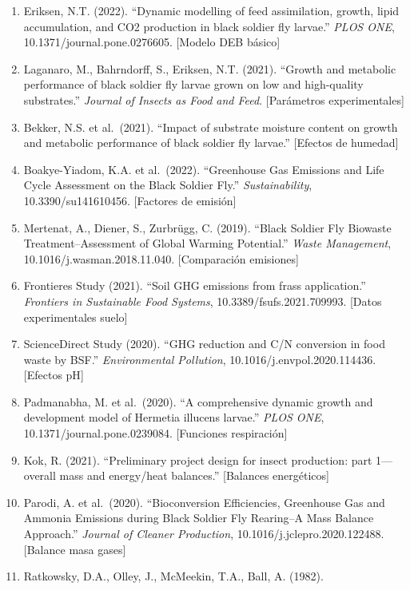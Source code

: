 \documentclass[
]{article}
\begin{document}
\begin{enumerate}
\def\labelenumi{\arabic{enumi}.}
\item
  Eriksen, N.T. (2022). ``Dynamic modelling of feed assimilation,
  growth, lipid accumulation, and CO2 production in black soldier fly
  larvae.'' \emph{PLOS ONE}, 10.1371/journal.pone.0276605. {[}Modelo DEB
  básico{]}
\item
  Laganaro, M., Bahrndorff, S., Eriksen, N.T. (2021). ``Growth and
  metabolic performance of black soldier fly larvae grown on low and
  high-quality substrates.'' \emph{Journal of Insects as Food and Feed}.
  {[}Parámetros experimentales{]}
\item
  Bekker, N.S. et al.~(2021). ``Impact of substrate moisture content on
  growth and metabolic performance of black soldier fly larvae.''
  {[}Efectos de humedad{]}
\item
  Boakye-Yiadom, K.A. et al.~(2022). ``Greenhouse Gas Emissions and Life
  Cycle Assessment on the Black Soldier Fly.'' \emph{Sustainability},
  10.3390/su141610456. {[}Factores de emisión{]}
\item
  Mertenat, A., Diener, S., Zurbrügg, C. (2019). ``Black Soldier Fly
  Biowaste Treatment--Assessment of Global Warming Potential.''
  \emph{Waste Management}, 10.1016/j.wasman.2018.11.040. {[}Comparación
  emisiones{]}
\item
  Frontieres Study (2021). ``Soil GHG emissions from frass
  application.'' \emph{Frontiers in Sustainable Food Systems},
  10.3389/fsufs.2021.709993. {[}Datos experimentales suelo{]}
\item
  ScienceDirect Study (2020). ``GHG reduction and C/N conversion in food
  waste by BSF.'' \emph{Environmental Pollution},
  10.1016/j.envpol.2020.114436. {[}Efectos pH{]}
\item
  Padmanabha, M. et al.~(2020). ``A comprehensive dynamic growth and
  development model of Hermetia illucens larvae.'' \emph{PLOS ONE},
  10.1371/journal.pone.0239084. {[}Funciones respiración{]}
\item
  Kok, R. (2021). ``Preliminary project design for insect production:
  part 1---overall mass and energy/heat balances.'' {[}Balances
  energéticos{]}
\item
  Parodi, A. et al.~(2020). ``Bioconversion Efficiencies, Greenhouse Gas
  and Ammonia Emissions during Black Soldier Fly Rearing--A Mass Balance
  Approach.'' \emph{Journal of Cleaner Production},
  10.1016/j.jclepro.2020.122488. {[}Balance masa gases{]}
\item
  Ratkowsky, D.A., Olley, J., McMeekin, T.A., Ball, A. (1982).

\end{enumerate}
\end{document}
